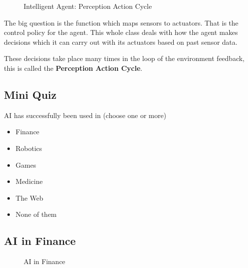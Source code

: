   \begin{figure}[!h]
      \centering
      \caption{Intelligent Agent: Perception Action Cycle}
      \label{fig:Intelligent_Agent}
  \end{figure}

  The big question is the function which maps sensors to actuators. That is the control policy for
  the agent. This whole class deals with how the agent makes decisions which it can carry out with
  its actuators based on past sensor data.

  These decisions take place many times in the loop of the environment feedback, this is called the
  {\bf Perception Action Cycle}.\\

\subsection{Mini Quiz}

  AI has successfully been used in (choose one or more)\\

  \begin{itemize}
    \renewcommand{\labelitemi}{$\square$}
    \item Finance
    \item Robotics
    \item Games
    \item Medicine
    \item The Web
    \item None of them
  \end{itemize}



\subsection{AI in Finance}

  \begin{figure}[!h]
      \centering
      \caption{AI in Finance}
      \label{fig:AI_in_Finance}
  \end{figure}




